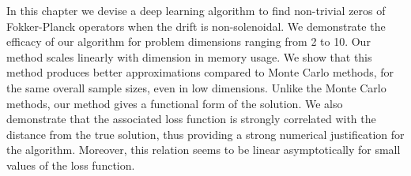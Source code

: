 
In this chapter we devise a deep learning algorithm to find non-trivial zeros of Fokker-Planck operators when the drift is non-solenoidal. We demonstrate the efficacy of our algorithm for problem dimensions ranging from 2 to 10. Our method scales linearly with dimension in memory usage. We show that this method produces better approximations compared to Monte Carlo methods, for the same overall sample sizes, even in low dimensions. Unlike the Monte Carlo methods, our method gives a functional form of the solution. We also demonstrate that the associated loss function is strongly correlated with the distance from the true solution, thus providing a strong numerical justification for the algorithm. Moreover, this relation seems to be linear asymptotically for small values of the loss function.
